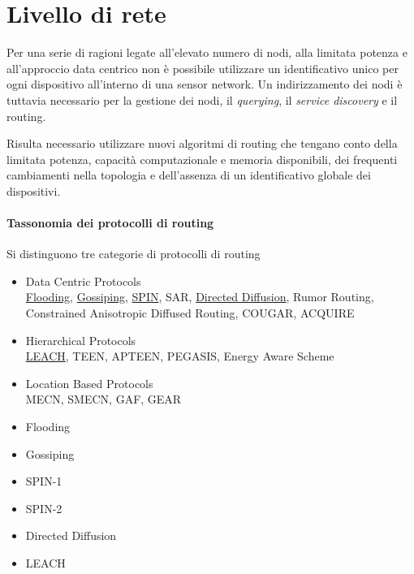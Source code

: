 \section{Livello di rete}

	Per una serie di ragioni legate all'elevato numero di nodi, alla limitata potenza e all'approccio data centrico non è possibile utilizzare un identificativo unico per ogni dispositivo all'interno di una sensor network.
	Un indirizzamento dei nodi è tuttavia necessario per la gestione dei nodi, il \emph{querying}, il \emph{service discovery} e il routing.
	
	Risulta necessario utilizzare nuovi algoritmi di routing che tengano conto della limitata potenza, capacità computazionale e memoria disponibili, dei frequenti cambiamenti nella topologia e dell'assenza di un identificativo globale dei dispositivi.
	
	\paragraph{Tassonomia dei protocolli di routing}
	Si distinguono tre categorie di protocolli di routing
	\begin{itemize}
		\item Data Centric Protocols\\
			\underline{Flooding}, \underline{Gossiping}, \underline{SPIN}, SAR, \underline{Directed Diffusion}, Rumor Routing, Constrained Anisotropic Diffused Routing, COUGAR, ACQUIRE
		
		\item Hierarchical Protocols\\
			\underline{LEACH}, TEEN, APTEEN, PEGASIS, Energy Aware Scheme
		
		\item Location Based Protocols\\
			MECN, SMECN, GAF, GEAR
	\end{itemize}

	\begin{itemize}
		\item Flooding
		\item Gossiping
		\item SPIN-1
		\item SPIN-2
		\item Directed Diffusion
		\item LEACH
	\end{itemize}